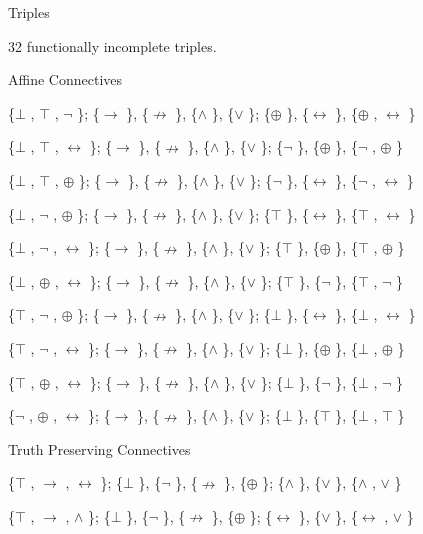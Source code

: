 \protect\hypertarget{anchor-14}{}{}Triples

32 functionally incomplete triples.

\protect\hypertarget{anchor-15}{}{}Affine Connectives

\{$\bot$ , $\top$ , $\neg$ \}; \{$\to$ \}, \{$\nrightarrow$ \}, \{$\land$ \}, \{$\lor$ \}; \{$\oplus$ \}, \{$\leftrightarrow$ \}, \{$\oplus$ , $\leftrightarrow$ \}

\{$\bot$ , $\top$ , $\leftrightarrow$ \}; \{$\to$ \}, \{$\nrightarrow$ \}, \{$\land$ \}, \{$\lor$ \}; \{$\neg$ \}, \{$\oplus$ \}, \{$\neg$ , $\oplus$ \}

\{$\bot$ , $\top$ , $\oplus$ \}; \{$\to$ \}, \{$\nrightarrow$ \}, \{$\land$ \}, \{$\lor$ \}; \{$\neg$ \}, \{$\leftrightarrow$ \}, \{$\neg$ , $\leftrightarrow$ \}

\{$\bot$ , $\neg$ , $\oplus$ \}; \{$\to$ \}, \{$\nrightarrow$ \}, \{$\land$ \}, \{$\lor$ \}; \{$\top$ \}, \{$\leftrightarrow$ \}, \{$\top$ , $\leftrightarrow$ \}

\{$\bot$ , $\neg$ , $\leftrightarrow$ \}; \{$\to$ \}, \{$\nrightarrow$ \}, \{$\land$ \}, \{$\lor$ \}; \{$\top$ \}, \{$\oplus$ \}, \{$\top$ , $\oplus$ \}

\{$\bot$ , $\oplus$ , $\leftrightarrow$ \}; \{$\to$ \}, \{$\nrightarrow$ \}, \{$\land$ \}, \{$\lor$ \}; \{$\top$ \}, \{$\neg$ \}, \{$\top$ , $\neg$ \}

\{$\top$ , $\neg$ , $\oplus$ \}; \{$\to$ \}, \{$\nrightarrow$ \}, \{$\land$ \}, \{$\lor$ \}; \{$\bot$ \}, \{$\leftrightarrow$ \}, \{$\bot$ , $\leftrightarrow$ \}

\{$\top$ , $\neg$ , $\leftrightarrow$ \}; \{$\to$ \}, \{$\nrightarrow$ \}, \{$\land$ \}, \{$\lor$ \}; \{$\bot$ \}, \{$\oplus$ \}, \{$\bot$ , $\oplus$ \}

\{$\top$ , $\oplus$ , $\leftrightarrow$ \}; \{$\to$ \}, \{$\nrightarrow$ \}, \{$\land$ \}, \{$\lor$ \}; \{$\bot$ \}, \{$\neg$ \}, \{$\bot$ , $\neg$ \}

\{$\neg$ , $\oplus$ , $\leftrightarrow$ \}; \{$\to$ \}, \{$\nrightarrow$ \}, \{$\land$ \}, \{$\lor$ \}; \{$\bot$ \}, \{$\top$ \}, \{$\bot$ , $\top$ \}

\protect\hypertarget{anchor-16}{}{}Truth Preserving Connectives

\{$\top$ , $\to$ , $\leftrightarrow$ \}; \{$\bot$ \}, \{$\neg$ \}, \{$\nrightarrow$ \}, \{$\oplus$ \}; \{$\land$ \}, \{$\lor$ \}, \{$\land$ , $\lor$ \}

\{$\top$ , $\to$ , $\land$ \}; \{$\bot$ \}, \{$\neg$ \}, \{$\nrightarrow$ \}, \{$\oplus$ \}; \{$\leftrightarrow$ \}, \{$\lor$ \}, \{$\leftrightarrow$ , $\lor$ \}

